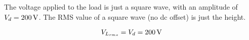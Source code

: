 \subsection{}

The voltage applied to the load is just a square wave, with an amplitude of $V_d=\unit[200]{V}$.
The RMS value of a square wave (no dc offset) is just the height.

$$
V_{L_{rms}} = V_d = \unit[200]{V}
$$

